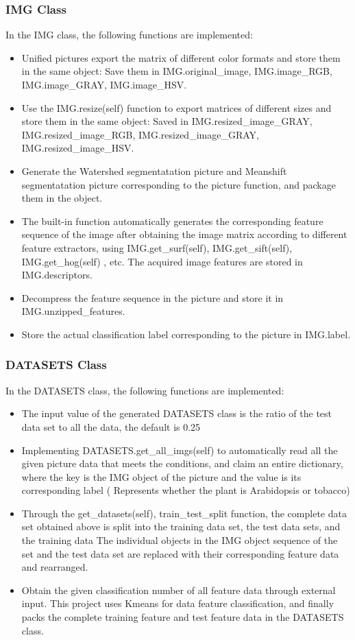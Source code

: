 \documentclass[conference]{IEEEtran}
\begin{document}
\subsubsection{IMG Class}
In the IMG class, the following functions are implemented:
\begin{itemize}
\item Unified pictures export the matrix of different color formats and store them in the same object: 
Save them in 
IMG.original\_image, 
IMG.image\_RGB, 
IMG.image\_GRAY, 
IMG.image\_HSV.
\item Use the IMG.resize(self) function to export matrices of different sizes and store them in the same object: 
Saved in 
IMG.resized\_image\_GRAY,
IMG.resized\_image\_RGB, 
IMG.resized\_image\_GRAY, 
IMG.resized\_image\_HSV.
\item Generate the Watershed segmentatation picture and 
Meanshift segmentatation picture corresponding to the picture function, and package them in the object.
\item The built-in function automatically generates the corresponding feature sequence of 
the image after obtaining the image matrix according to different feature extractors, 
using 
IMG.get\_surf(self), 
IMG.get\_sift(self), 
IMG.get\_hog(self)
, etc. 
The acquired image features are stored in 
IMG.descriptors.
\item Decompress the feature sequence in the picture and store it in 
IMG.unzipped\_features.
\item Store the actual classification label corresponding to the picture in 
IMG.label.
\end{itemize}
\subsubsection{DATASETS Class}
In the DATASETS class, the following functions are implemented:
\begin{itemize}
\item The input value of the generated DATASETS class is the ratio of the test data set to all the data, the default is 0.25
\item Implementing DATASETS.get\_all\_imgs(self) to automatically read all the given picture data that meets the conditions, and claim an entire dictionary, where the key is the IMG object of the picture and the value is its corresponding label ( Represents whether the plant is Arabidopsis or tobacco)
\item Through the get\_datasets(self), train\_test\_split function, the complete data set obtained above is split into the training data set, the test data sets, and the training data The individual objects in the IMG object sequence of the set and the test data set are replaced with their corresponding feature data and rearranged.
\item Obtain the given classification number of all feature data through external input. This project uses Kmeans for data feature classification, and finally packs the complete training feature and test feature data in the DATASETS class.
\end{itemize}
\end{document}

